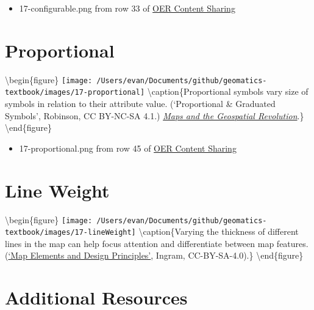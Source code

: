 \documentclass[
]{book}
\providecommand{\tightlist}{%
  \setlength{\itemsep}{0pt}\setlength{\parskip}{0pt}}
\begin{document}
\begin{itemize}
\tightlist
\item
  17-configurable.png from row 33 of \href{https://docs.google.com/spreadsheets/d/1LqzXn00wMeIjHWstNT3tMImNDZirLGc3g72jFOQc_8I/edit\#gid=817407192}{OER Content Sharing}
\end{itemize}

\hypertarget{proportional}{%
\section{Proportional}\label{proportional}}

\textbackslash begin\{figure\}
\texttt{[image: /Users/evan/Documents/github/geomatics-textbook/images/17-proportional]} \textbackslash caption\{Proportional symbols vary size of symbols in relation to their attribute value. (`Proportional \& Graduated Symbols', \citet{Anthony} Robinson, CC BY-NC-SA 4.1.) \href{https://www.e-education.psu.edu/maps/l5_p3.html}{\emph{Maps and the Geospatial Revolution}}.\}\label{fig:17-proportional}
\textbackslash end\{figure\}

\begin{itemize}
\tightlist
\item
  17-proportional.png from row 45 of \href{https://docs.google.com/spreadsheets/d/1LqzXn00wMeIjHWstNT3tMImNDZirLGc3g72jFOQc_8I/edit\#gid=817407192}{OER Content Sharing}
\end{itemize}

\hypertarget{line-weight}{%
\section{Line Weight}\label{line-weight}}

\textbackslash begin\{figure\}
\texttt{[image: /Users/evan/Documents/github/geomatics-textbook/images/17-lineWeight]} \textbackslash caption\{Varying the thickness of different lines in the map can help focus attention and differentiate between map features. (\href{https://alg.manifoldapp.org/read/introduction-to-cartography/section/b9662d0a-4926-4947-922d-a67a2cae0eec\#2}{`Map Elements and Design Principles'}, \citet{Uli} Ingram, CC-BY-SA-4.0).\}\label{fig:17-lineWeight}
\textbackslash end\{figure\}

\hypertarget{additional-resources}{%
\section{Additional Resources}\label{additional-resources}}
\end{document}
